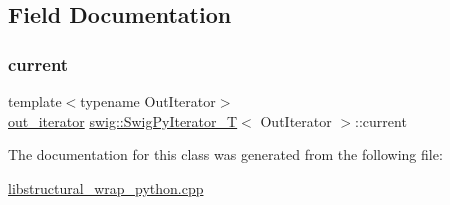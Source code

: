 \subsection{Field Documentation}
\mbox{\label{classswig_1_1_swig_py_iterator___t_a7b69908f19b9150a4d2b357567f8bd82}} 
\subsubsection{\texorpdfstring{current}{current}}
{\footnotesize\ttfamily template$<$typename Out\+Iterator$>$ \\
\hyperlink{classswig_1_1_swig_py_iterator___t_aec35545038c3d804975a147253f061e4}{out\+\_\+iterator} \hyperlink{classswig_1_1_swig_py_iterator___t}{swig\+::\+Swig\+Py\+Iterator\+\_\+T}$<$ Out\+Iterator $>$\+::current\hspace{0.3cm}{\ttfamily [protected]}}



The documentation for this class was generated from the following file\+:\begin{DoxyCompactItemize}
\item 
\hyperlink{libstructural__wrap__python_8cpp}{libstructural\+\_\+wrap\+\_\+python.\+cpp}\end{DoxyCompactItemize}

